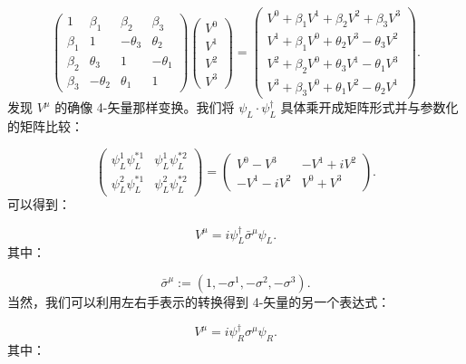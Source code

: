 \documentclass[10pt,UTF8]{ctexart}
\begin{document}
\begin{equation}
\left(\begin{array}{cccc}
1 & \beta_{1} & \beta_{2} & \beta_{3}\\
\beta_{1} & 1 & -\theta_{3} & \theta_{2}\\
\beta_{2} & \theta_{3} & 1 & -\theta_{1}\\
\beta_{3} & -\theta_{2} & \theta_{1} & 1
\end{array}\right)\left(\begin{array}{c}
V^{0}\\
V^{1}\\
V^{2}\\
V^{3}
\end{array}\right)=\left(\begin{array}{c}
V^{0}+\beta_{1}V^{1}+\beta_{2}V^{2}+\beta_{3}V^{3}\\
V^{1}+\beta_{1}V^{0}+\theta_{2}V^{3}-\theta_{3}V^{2}\\
V^{2}+\beta_{2}V^{0}+\theta_{3}V^{1}-\theta_{1}V^{3}\\
V^{3}+\beta_{3}V^{0}+\theta_{1}V^{2}-\theta_{2}V^{1}
\end{array}\right).
\end{equation}
发现 $V^{\mu}$ 的确像 4-矢量那样变换。我们将 $\psi_{L}\cdot\psi_{L}^{\dagger}$
具体乘开成矩阵形式并与参数化的矩阵比较：

\begin{equation}
\left(\begin{array}{cc}
\psi_{L}^{1}\psi_{L}^{*1} & \psi_{L}^{1}\psi_{L}^{*2}\\
\psi_{L}^{2}\psi_{L}^{*1} & \psi_{L}^{2}\psi_{L}^{*2}
\end{array}\right)=\left(\begin{array}{cc}
V^{0}-V^{3} & -V^{1}+iV^{2}\\
-V^{1}-iV^{2} & V^{0}+V^{3}
\end{array}\right).
\end{equation}
可以得到：

\begin{equation}
V^{\mu}=i\psi_{L}^{\dagger}\bar{\sigma}^{\mu}\psi_{L}.
\end{equation}
其中：

\begin{equation}
\bar{\sigma}^{\mu}:=\left(1,-\sigma^{1},-\sigma^{2},-\sigma^{3}\right).
\end{equation}
当然，我们可以利用左右手表示的转换得到 4-矢量的另一个表达式：

\begin{equation}
V^{\mu}=i\psi_{R}^{\dagger}\sigma^{\mu}\psi_{R}.
\end{equation}
其中：
\end{document}
